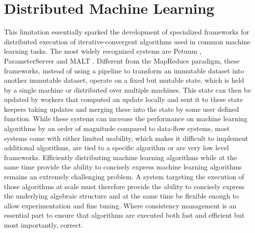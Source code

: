 \section{Distributed Machine Learning}
This limitation essentially sparked the development of specialized frameworks for distributed execution of iterative-convergent algorithms used in common machine learning tasks.
The most widely recognized systems are Petuum \cite{Xing2015}, ParameterServer \cite{Li2014} and MALT \cite{Li2015}.
Different from the MapReduce paradigm, these frameworks, instead of using a pipeline to transform an immutable dataset into another immutable dataset, operate on a fixed but mutable state, which is held by a single machine or distributed over multiple machines.
This state can then be updated by workers that computed an update locally and sent it to these state keepers taking updates and merging these into the state by some user defined function.
While these systems can increase the performance on machine learning algorithms by an order of magnitude \cite{Xing2015} compared to data-flow systems, most systems come with either limited usability, which makes it difficult to implement additional algorithms, are tied to a specific algorithm or are very low level frameworks.
Efficiently distributing machine learning algorithms while at the same time provide the ability to concisely express machine learning algorithms remains an extremely challenging problem.
A system targeting the execution of those algorithms at scale must therefore provide the ability to concisely express the underlying algebraic structure and at the same time be flexible enough to allow experimentation and fine tuning.
Where consistency management is an essential part to ensure that algorithms are executed both fast and efficient but most importantly, correct.


